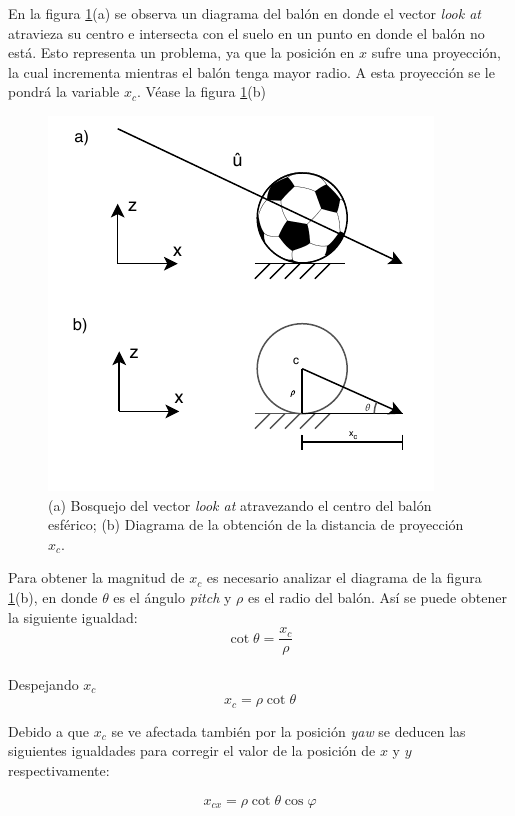 \documentclass{book}
\begin{document}
En la figura \ref{fig:ballProjection}(a) se observa un diagrama del balón en donde el vector \textit{look at} atravieza su centro e intersecta con el suelo en un punto en donde el balón no está. Esto representa un problema, ya que la posición en $x$ sufre una proyección, la cual incrementa mientras el balón tenga mayor radio. A esta proyección se le pondrá la variable $x_c$. Véase la figura \ref{fig:ballProjection}(b)


\begin{figure}
	\centering
	\includegraphics[scale=1.4]{images/ball_projection.pdf}
	\caption{(a) Bosquejo del vector \textit{look at} atravezando el centro del balón esférico; (b) Diagrama de la obtención de la distancia de proyección $x_c$.}
	\label{fig:ballProjection}
\end{figure}

Para obtener la magnitud de $x_c$ es necesario analizar el diagrama de la figura \ref{fig:ballProjection}(b), en donde $\theta$ es el ángulo \textit{pitch} y $\rho$ es el radio del balón. Así se puede obtener la siguiente igualdad:
\[\cot{\theta} = \frac{x_c}{\rho}\]\\

Despejando $x_c$
\[x_c = \rho \cot{\theta}\]

Debido a que $x_c$ se ve afectada también por la posición \textit{yaw} se deducen las siguientes igualdades para corregir el valor de la posición de $x$ y $y$ respectivamente:

\begin{equation}
\label{eq:xcForX}
x_{cx} = \rho \cot{\theta} \cos{\varphi}
\end{equation}
\end{document}
